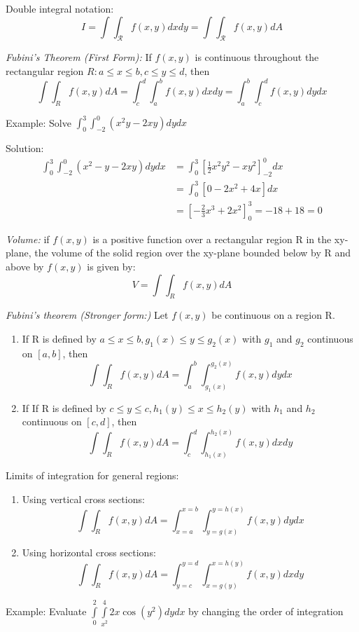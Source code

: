 \documentclass[12pt]{article}
\begin{document}
Double integral notation:
\[I = \int \int_\mathcal{R} f(x, y) dx dy = \int \int_\mathcal{R} f(x, y) dA\]

\emph{Fubini's Theorem (First Form):}
If $f(x,y)$ is continuous throughout the rectangular region $R: a \leq x \leq b, c \leq y \leq d$, then 
\[\int \int_R f(x,y) dA = \int_c^d \int_a^b f(x,y) dx dy = \int_a^b \int_c^d f(x,y) dy dx\]

Example: Solve $\int_0^3 \int_{-2}^0 (x^2 y - 2xy) dy dx$

Solution:
\begin{align*}
    \int_0^3 \int_{-2}^0 (x^2 - y - 2xy) dy dx &= \int_0^3 \left[\frac{1}{2}x^2 y^2 - xy^2 \right]_{-2}^0 dx \\
    &= \int_0^3 [0 - 2x^2 + 4x] dx \\
    &= \left[-\frac{2}{3} x^3 +2x^2 \right]_0^3 = -18 + 18 = 0
\end{align*}

\emph{Volume:} if $f(x,y)$ is a positive function over a rectangular region R in the xy-plane, the volume of the solid region over the xy-plane bounded below by R and above by $f(x,y)$ is given by:
\[V = \int \int_R f(x,y) dA\]

\emph{Fubini's theorem (Stronger form:)} Let $f(x, y)$ be continuous on a region R. 
\begin{enumerate}
    \item If R is defined by $a \leq x \leq b, g_1(x) \leq y \leq g_2(x)$ with $g_1$ and $g_2$ continuous on $[a,b]$, then 
    \[\int \int_R f(x,y) dA = \int_a^b \int_{g_1(x)}^{g_2(x)} f(x, y) dy dx\]
    \item If If R is defined by $c \leq y \leq c, h_1(y) \leq x \leq h_2(y)$ with $h_1$ and $h_2$ continuous on $[c, d]$, then 
    \[\int \int_R f(x,y) dA = \int_c^d \int_{h_1(x)}^{h_2(x)} f(x, y) dx dy\]
\end{enumerate}

Limits of integration for general regions:
\begin{enumerate}
    \item Using vertical cross sections:
    \[\int \int_R f(x,y) dA = \int_{x=a}^{x=b} \int_{y=g(x)}^{y=h(x)} f(x, y) dy dx\]
    \item Using horizontal cross sections:
    \[\int \int_R f(x,y) dA = \int_{y=c}^{y=d} \int_{x=g(y)}^{x=h(y)} f(x, y) dx dy\]
\end{enumerate}
\pagebreak
Example: Evaluate $\int\limits_0^2 \int\limits_{x^2}^4 2x \cos(y^2) dy dx$ by changing the order of integration
\end{document}
